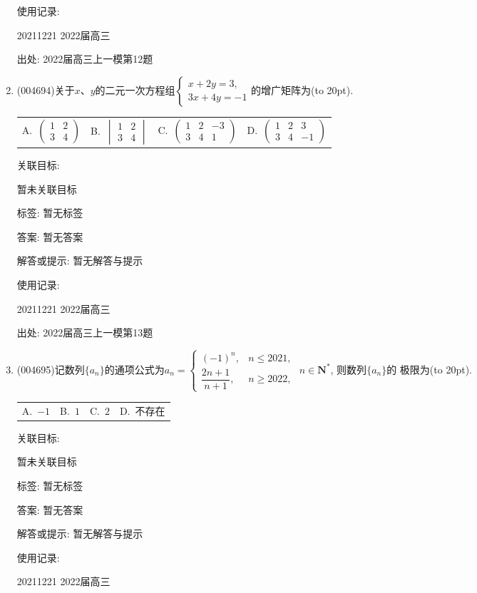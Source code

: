 \documentclass[10pt,a4paper]{article}
\newcommand{\bracket}[1]{(\hbox to #1pt{})}
\newcommand{\fourch}[4]{\par\begin{tabular}{p{.23\textwidth}p{.23\textwidth}p{.23\textwidth}p{.23\textwidth}}
A.~#1 &B.~#2& C.~#3& D.~#4
\end{tabular}}
\begin{document}
\begin{enumerate}[1.]
使用记录:

20211221	2022届高三	


出处: 2022届高三上一模第12题
\item { (004694)}关于$x$、$y$的二元一次方程组$\begin{cases}x+2y=3, \\ 3x+4y=-1 \end{cases}$的增广矩阵为\bracket{20}.
\fourch{$\begin{pmatrix}1 & 2  \\3 & 4  \end{pmatrix}$}{$\begin{vmatrix} 1 & 2  \\3 & 4  \end{vmatrix}$}{$\begin{pmatrix} 1 & 2 & -3 \\ 3 & 4 & 1\end{pmatrix}$}{$\begin{pmatrix}1 & 2 & 3 \\ 3 & 4 & -1\end{pmatrix}$}


关联目标:

暂未关联目标



标签: 暂无标签

答案: 暂无答案

解答或提示: 暂无解答与提示

使用记录:

20211221	2022届高三	


出处: 2022届高三上一模第13题
\item { (004695)}记数列$\{a_n\}$的通项公式为$a_n=\begin{cases}
(-1)^n, &  n\le 2021,  \\ \dfrac{2n+1}{n+1}, &  n\ge 2022, \end{cases}$ $n\in \mathbf{N}^*$, 则数列$\{a_n\}$的
极限为\bracket{20}.
\fourch{$-1$}{$1$}{$2$}{不存在}


关联目标:

暂未关联目标



标签: 暂无标签

答案: 暂无答案

解答或提示: 暂无解答与提示

使用记录:

20211221	2022届高三	



\end{enumerate}
\end{document}

